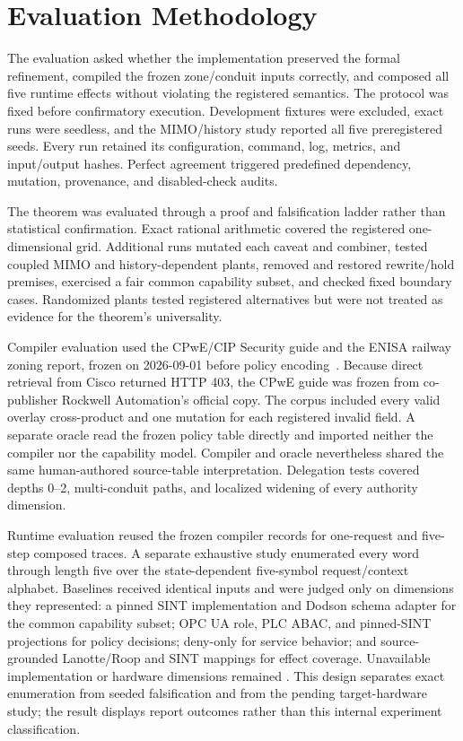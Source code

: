 \section{Evaluation Methodology}
\label{sec:evaluation}

The evaluation asked whether the implementation preserved the formal refinement, compiled the frozen zone/conduit inputs correctly, and composed all five runtime effects without violating the registered semantics. The protocol was fixed before confirmatory execution. Development fixtures were excluded, exact runs were seedless, and the MIMO/history study reported all five preregistered seeds. Every run retained its configuration, command, log, metrics, and input/output hashes. Perfect agreement triggered predefined dependency, mutation, provenance, and disabled-check audits.

The theorem was evaluated through a proof and falsification ladder rather than statistical confirmation. Exact rational arithmetic covered the registered one-dimensional grid. Additional runs mutated each caveat and combiner, tested coupled MIMO and history-dependent plants, removed and restored rewrite/hold premises, exercised a fair common capability subset, and checked fixed boundary cases. Randomized plants tested registered alternatives but were not treated as evidence for the theorem's universality.

Compiler evaluation used the CPwE/CIP Security guide and the ENISA railway zoning report, frozen on 2026-09-01 before policy encoding~\cite{cpwe2020,enisa2022}. Because direct retrieval from Cisco returned HTTP 403, the CPwE guide was frozen from co-publisher Rockwell Automation's official copy. The corpus included every valid overlay cross-product and one mutation for each registered invalid field. A separate oracle read the frozen policy table directly and imported neither the compiler nor the capability model. Compiler and oracle nevertheless shared the same human-authored source-table interpretation. Delegation tests covered depths 0--2, multi-conduit paths, and localized widening of every authority dimension.

Runtime evaluation reused the frozen compiler records for one-request and five-step composed traces. A separate exhaustive study enumerated every word through length five over the state-dependent five-symbol request/context alphabet. Baselines received identical inputs and were judged only on dimensions they represented: a pinned SINT implementation and Dodson schema adapter for the common capability subset; OPC UA role, PLC ABAC, and pinned-SINT projections for policy decisions; deny-only for service behavior; and source-grounded Lanotte/Roop and SINT mappings for effect coverage. Unavailable implementation or hardware dimensions remained \NA. This design separates exact enumeration from seeded falsification and from the pending target-hardware study; the result displays report outcomes rather than this internal experiment classification.


